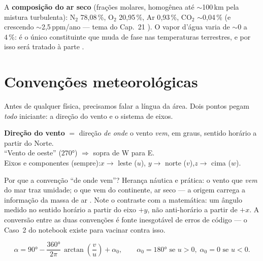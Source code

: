 \documentclass[11pt]{article}
\begin{document}
A \textbf{composição do ar seco} (frações molares, homogênea até
$\sim$100\,km pela mistura turbulenta): N$_2$ 78{,}08\,\%, O$_2$ 20{,}95\,\%,
Ar 0{,}93\,\%, CO$_2$ $\sim$0{,}04\,\% (e crescendo $\sim$2,5\,ppm/ano — tema
do Cap.~21 ). O vapor d'água varia de
$\sim 0$ a $4\,\%$: é o único constituinte que muda de fase nas temperaturas
terrestres, e por isso será tratado à parte .


\section{Convenções meteorológicas}\label{sec:conv}

Antes de qualquer física, precisamos falar a língua da área. Dois pontos
pegam \emph{todo} iniciante: a direção do vento e o sistema de eixos.


\begin{noquadro}
\textbf{Direção do vento} $=$ direção \emph{de onde} o vento \emph{vem},
em graus, sentido horário a partir do Norte.\\
``Vento de oeste'' ($270°$) $\Rightarrow$ sopra de W para E.\\[4pt]
Eixos e componentes (sempre):\quad $x\to$ leste ($u$),\quad
$y\to$ norte ($v$),\quad $z\to$ cima ($w$).
\end{noquadro}

Por que a convenção ``de onde vem''? Herança náutica e prática: o vento que
\emph{vem} do mar traz umidade; o que vem do continente, ar seco — a origem
carrega a informação da massa de ar . Note o
contraste com a matemática: um ângulo medido no sentido horário a partir do
eixo $+y$, não anti-horário a partir de $+x$. A conversão entre as duas
convenções é fonte inesgotável de erros de código — o Caso~2 do notebook
existe para vacinar contra isso.

\begin{formalivro}
\[ \alpha = 90° - \frac{360°}{2\pi}\,\arctan\!\left(\frac{v}{u}\right) + \alpha_0,
\qquad \alpha_0 = 180° \text{ se } u>0,\; \alpha_0=0 \text{ se } u<0. \]
\end{formalivro}
\end{document}
